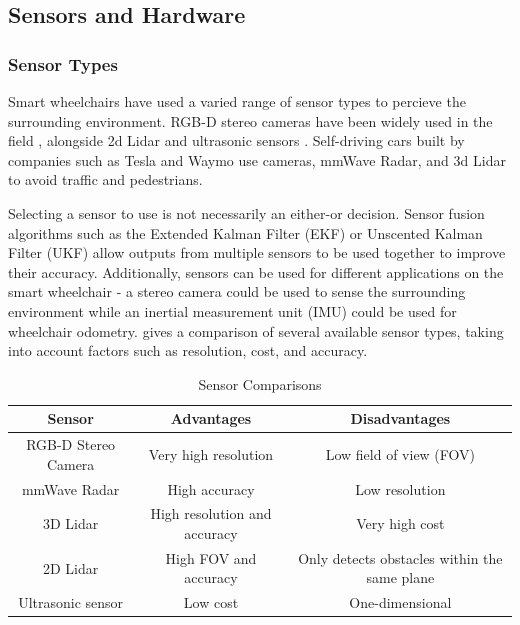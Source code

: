 \documentclass[12pt]{article}
\begin{document}
\subsection{Sensors and Hardware}

\subsubsection{Sensor Types}
Smart wheelchairs have used a varied range of sensor types to percieve the surrounding environment.
RGB-D stereo cameras have been widely used in the field \cite{wangS2P2SelfSupervisedGoalDirected2021}\cite{wangSelfSupervisedDrivableArea2019}\cite{jainAutomatedPerceptionSafe2014},
alongside 2d Lidar \cite{scudellariSelfdrivingWheelchairsDebut2017} and ultrasonic sensors \cite{levineNavChairAssistiveWheelchair1999}.
Self-driving cars built by companies such as Tesla and Waymo
use cameras, mmWave Radar, and 3d Lidar to avoid traffic and pedestrians.

Selecting a sensor to use is not necessarily an either-or decision. Sensor fusion algorithms such as
the Extended Kalman Filter (EKF) or Unscented Kalman Filter (UKF) \cite{wanUnscentedKalmanFilter2000} allow
outputs from multiple sensors to be used together to improve their accuracy. Additionally, sensors can
be used for different applications on the smart wheelchair - a stereo camera could be used to sense the surrounding environment
while an inertial measurement unit (IMU) could be used for wheelchair odometry.
 gives a comparison of several available sensor types,
taking into account factors such as resolution, cost, and accuracy.

\begin{table}[H]
    \centering
\begin{adjustbox}{width=\textwidth}
    \begin{tabular}{c c c}
    \toprule
    Sensor & Advantages & Disadvantages \\
    \midrule
    RGB-D Stereo Camera & Very high resolution & Low field of view (FOV) \\
    mmWave Radar & High accuracy & Low resolution \\
    3D Lidar & High resolution and accuracy & Very high cost \\
    2D Lidar & High FOV and accuracy & Only detects obstacles within the same plane \\
    Ultrasonic sensor & Low cost & One-dimensional \\
    \bottomrule
    \end{tabular}
\end{adjustbox}
    \caption{Sensor Comparisons}
    \label{table:sensor_options}
\end{table}
\end{document}
